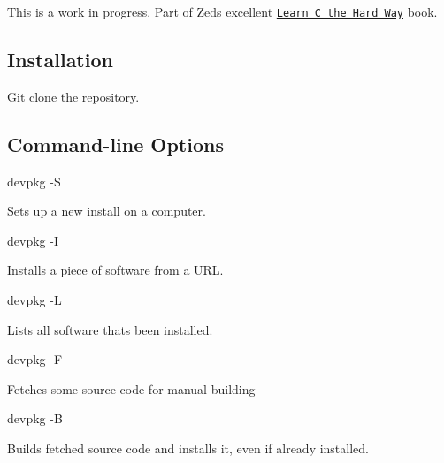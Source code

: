 This is a work in progress. Part of Zed\textquotesingle{}s excellent \href{http://c.learncodethehardway.org/book/ex26.html}{\tt Learn C the Hard Way} book.

\subsection*{Installation}

Git clone the repository.

\subsection*{Command-\/line Options}


\begin{DoxyItemize}
\item devpkg -\/\+S
\begin{DoxyItemize}
\item Sets up a new install on a computer.
\end{DoxyItemize}
\item devpkg -\/\+I
\begin{DoxyItemize}
\item Installs a piece of software from a U\+R\+L.
\end{DoxyItemize}
\item devpkg -\/\+L
\begin{DoxyItemize}
\item Lists all software that\textquotesingle{}s been installed.
\end{DoxyItemize}
\item devpkg -\/\+F
\begin{DoxyItemize}
\item Fetches some source code for manual building
\end{DoxyItemize}
\item devpkg -\/\+B
\begin{DoxyItemize}
\item Builds fetched source code and installs it, even if already installed. 
\end{DoxyItemize}
\end{DoxyItemize}